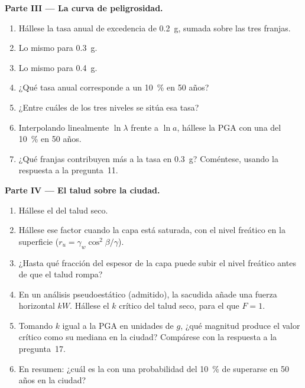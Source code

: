 \begin{problem}
\noindent\textbf{Parte III --- La curva de peligrosidad.}
\begin{enumerate}[resume]
  \item Hállese la tasa anual de excedencia de \qty{0.2}{g}, sumada sobre las tres franjas.
  \item Lo mismo para \qty{0.3}{g}.
  \item Lo mismo para \qty{0.4}{g}.
  \item ¿Qué tasa anual corresponde a un \qty{10}{\percent} en 50 años?
  \item ¿Entre cuáles de los tres niveles se sitúa esa tasa?
  \item Interpolando linealmente $\ln\lambda$ frente a $\ln a$, hállese la PGA con una
         del \qty{10}{\percent} en 50 años.
  \item ¿Qué franjas contribuyen más a la tasa en \qty{0.3}{g}? Coméntese, usando la respuesta a la
        pregunta~11.
\end{enumerate}

\noindent\textbf{Parte IV --- El talud sobre la ciudad.}
\begin{enumerate}[resume]
  \item Hállese el  del talud seco.
  \item Hállese ese factor cuando la capa está saturada, con el nivel freático en la superficie ($r_u =
        \gamma_w\cos^2\beta/\gamma$).
  \item ¿Hasta qué fracción del espesor de la capa puede subir el nivel freático antes de que el talud rompa?
  \item En un análisis pseudoestático (admitido), la sacudida añade una fuerza horizontal $kW$. Hállese el
        $k$ crítico del talud seco, para el que $F = 1$.
  \item Tomando $k$ igual a la PGA en unidades de $g$, ¿qué magnitud produce el valor crítico como
        su mediana en la ciudad? Compárese con la respuesta a la pregunta~17.
  \item En resumen: ¿cuál es la  con una probabilidad del \qty{10}{\percent} de
        superarse en 50 años en la ciudad?
\end{enumerate}
\end{problem}
